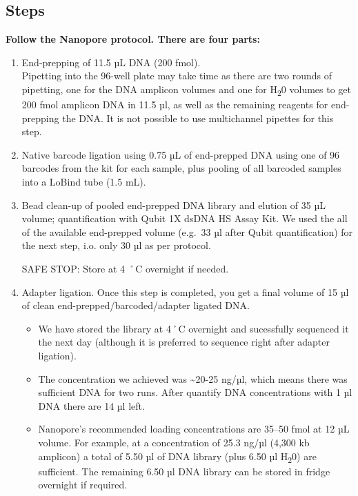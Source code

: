 \documentclass[
]{book}
\begin{document}
\subsection{Steps}\label{steps-2}

\textbf{Follow the Nanopore protocol. There are four parts:}

\begin{enumerate}
\def\labelenumi{\arabic{enumi}.}
\item
  End-prepping of 11.5 µL DNA (200 fmol).\\
  Pipetting into the 96-well plate may take time as there are two rounds of pipetting, one for the DNA amplicon volumes and one for H\textsubscript{2}0 volumes to get 200 fmol amplicon DNA in 11.5 µl, as well as the remaining reagents for end-prepping the DNA. It is not possible to use multichannel pipettes for this step.
\item
  Native barcode ligation using 0.75 µL of end-prepped DNA using one of 96 barcodes from the kit for each sample, plus pooling of all barcoded samples into a LoBind tube (1.5 mL).
\item
  Bead clean-up of pooled end-prepped DNA library and elution of 35 µL volume; quantification with Qubit 1X dsDNA HS Assay Kit. We used the all of the available end-prepped volume (e.g.~33 µl after Qubit quantification) for the next step, i.o. only 30 µl as per protocol.

  SAFE STOP: Store at 4 ˚C overnight if needed.
\item
  Adapter ligation. Once this step is completed, you get a final volume of 15 µl of clean end-prepped/barcoded/adapter ligated DNA.

  \begin{itemize}
  \item
    We have stored the library at 4˚C overnight and sucessfully sequenced it the next day (although it is preferred to sequence right after adapter ligation).
  \item
    The concentration we achieved was \textasciitilde20-25 ng/µl, which means there was sufficient DNA for two runs. After quantify DNA concentrations with 1 µl DNA there are 14 µl left.
  \item
    Nanopore's recommended loading concentrations are 35--50 fmol at 12 µL volume. For example, at a concentration of 25.3 ng/µl (4,300 kb amplicon) a total of 5.50 µl of DNA library (plus 6.50 µl H\textsubscript{2}0) are sufficient. The remaining 6.50 µl DNA library can be stored in fridge overnight if required.
  \end{itemize}
\end{enumerate}
\end{document}
